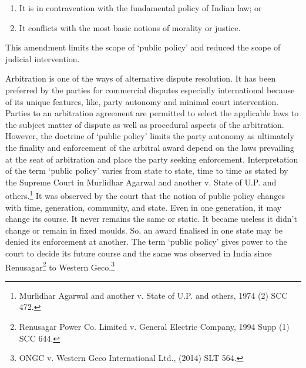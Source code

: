 \begin{multicols}{2}
\begin{enumerate}
\item It is in contravention with the fundamental policy of Indian law; or

\item It conflicts with the most basic notions of morality or justice.
\end{enumerate}

\vspace{-.3cm}

\noi
This amendment limits the scope of ‘public policy’ and reduced the scope of judicial
intervention.


\noi
Arbitration is one of the ways of alternative dispute resolution. It has been preferred by the
parties for commercial disputes especially international because of its unique features, like,
party autonomy and minimal court intervention. Parties to an arbitration agreement are
permitted to select the applicable laws to the subject matter of dispute as well as procedural
aspects of the arbitration. However, the doctrine of ‘public policy’ limits the party autonomy
as ultimately the finality and enforcement of the arbitral award depend on the laws prevailing
at the seat of arbitration and place the party seeking enforcement. Interpretation of the term
‘public policy’ varies from state to state, time to time as stated by the Supreme Court in
Murlidhar Agarwal and another v. State of U.P. and others.\footnote{Murlidhar Agarwal and another v. State of U.P. and others, 1974 (2) SCC 472.} It was observed by the court that the notion of public policy changes with time, generation, community, and state. Even in one
generation, it may change its course. It never remains the same or static. It became useless it
didn’t change or remain in fixed moulds. So, an award finalised in one state may be denied its
enforcement at another. The term ‘public policy’ gives power to the court to decide its future
course and the same was observed in India since Renusagar\footnote{Renusagar Power Co. Limited v. General Electric Company, 1994 Supp (1) SCC 644.} to Western Geco.\footnote{ONGC v. Western Geco International Ltd., (2014) SLT 564.}


\end{multicols}

